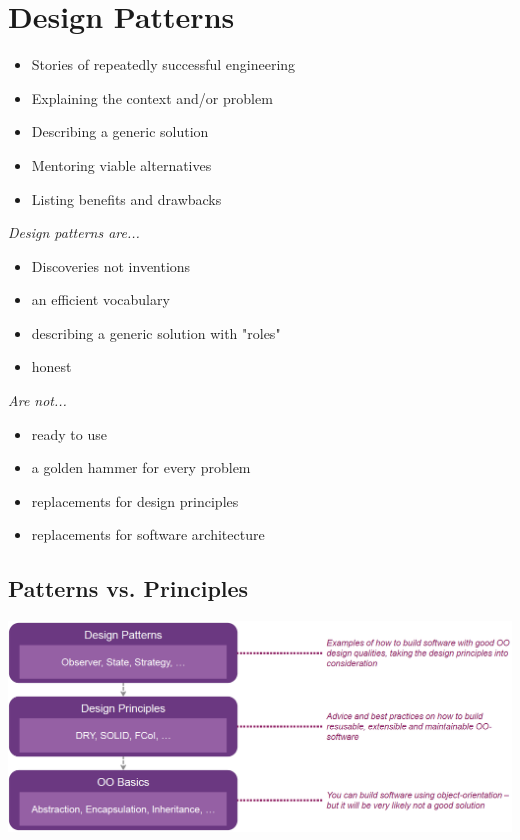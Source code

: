 
\section{Design Patterns}
\begin{itemize}
    \item Stories of repeatedly successful engineering
    \item Explaining the context and/or problem
    \item Describing a generic solution
    \item Mentoring viable alternatives
    \item Listing benefits and drawbacks
\end{itemize}
\textit{Design patterns are...}
\begin{itemize}
    \item Discoveries not inventions
    \item an efficient vocabulary
    \item describing a generic solution with "roles"
    \item honest
\end{itemize}
\textit{Are not...}
\begin{itemize}
    \item ready to use
    \item a golden hammer for every problem
    \item replacements for design principles
    \item replacements for software architecture
\end{itemize}

\subsection{Patterns vs. Principles}
\includegraphics[width=\linewidth]{../img/patterns_vs_principles.png}

